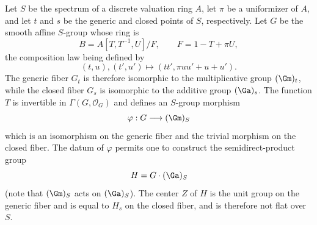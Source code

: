 Let \(S\) be the spectrum of a discrete valuation ring \(A\), let
\(\pi\) be a uniformizer of \(A\), and let \(t\) and \(s\) be the
generic and closed points of \(S\), respectively. Let \(G\) be the
smooth affine \(S\)-group whose ring is
\[
  B=A[T,T^{-1},U]/F,\qquad F=1-T+\pi U,
\]
the composition law being defined by
\[
  (t,u),(t',u')\longmapsto (tt',\pi uu'+u+u').
\]
The generic fiber \(G_t\) is therefore isomorphic to the
multiplicative group \((\Gm)_t\), while the closed fiber \(G_s\)
is isomorphic to the additive group \((\Ga)_s\). The function
\(T\) is invertible in \(\Gamma(G,\mathcal O_G)\) and defines an
\(S\)-group morphism
\[
  \varphi:G\longrightarrow(\Gm)_S
\]
which is an isomorphism on the generic fiber and the trivial
morphism on the closed fiber. The datum of \(\varphi\) permits one
to construct the semidirect-product group
\[
  H=G\cdot(\Ga)_S
\]
(note that \((\Gm)_S\) acts on \((\Ga)_S\)). The center \(Z\) of
\(H\) is the unit group on the generic fiber and is equal to
\(H_s\) on the closed fiber, and is therefore not flat over \(S\).
